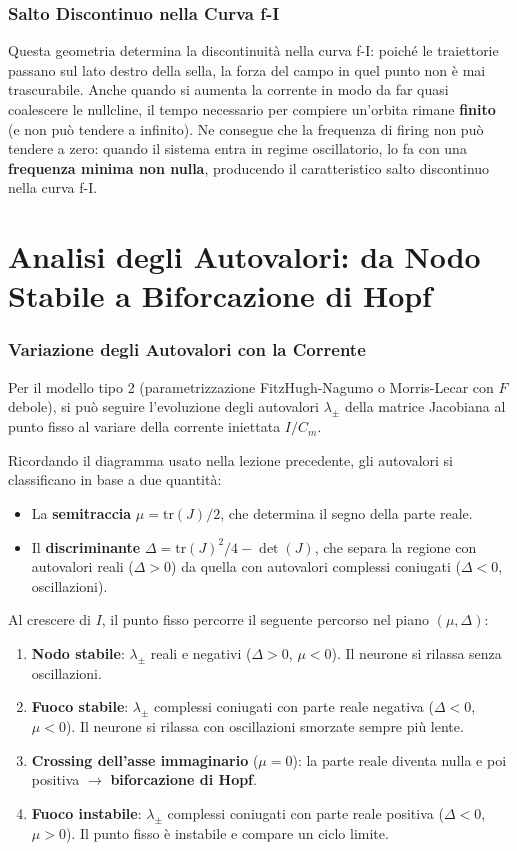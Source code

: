 \subsubsection{Salto Discontinuo nella Curva f-I}
Questa geometria determina la discontinuità nella curva f-I: poiché le traiettorie passano sul lato destro della sella, la forza del campo in quel punto non è mai trascurabile. Anche quando si aumenta la corrente in modo da far quasi coalescere le nullcline, il tempo necessario per compiere un'orbita rimane \textbf{finito} (e non può tendere a infinito). Ne consegue che la frequenza di firing non può tendere a zero: quando il sistema entra in regime oscillatorio, lo fa con una \textbf{frequenza minima non nulla}, producendo il caratteristico salto discontinuo nella curva f-I.

\section{Analisi degli Autovalori: da Nodo Stabile a Biforcazione di Hopf}

\subsubsection{Variazione degli Autovalori con la Corrente}

Per il modello tipo 2 (parametrizzazione FitzHugh-Nagumo o Morris-Lecar con $F$ debole), si può seguire l'evoluzione degli autovalori $\lambda_\pm$ della matrice Jacobiana al punto fisso al variare della corrente iniettata $I/C_m$.

Ricordando il diagramma usato nella lezione precedente, gli autovalori si classificano in base a due quantità:
\begin{itemize}
    \item La \textbf{semitraccia} $\mu = \text{tr}(J)/2$, che determina il segno della parte reale.
    \item Il \textbf{discriminante} $\Delta = \text{tr}(J)^2/4 - \det(J)$, che separa la regione con autovalori reali ($\Delta > 0$) da quella con autovalori complessi coniugati ($\Delta < 0$, oscillazioni).
\end{itemize}

Al crescere di $I$, il punto fisso percorre il seguente percorso nel piano $(\mu, \Delta)$:

\begin{enumerate}
    \item \textbf{Nodo stabile}: $\lambda_\pm$ reali e negativi ($\Delta > 0$, $\mu < 0$). Il neurone si rilassa senza oscillazioni.
    \item \textbf{Fuoco stabile}: $\lambda_\pm$ complessi coniugati con parte reale negativa ($\Delta < 0$, $\mu < 0$). Il neurone si rilassa con oscillazioni smorzate sempre più lente.
    \item \textbf{Crossing dell'asse immaginario} ($\mu = 0$): la parte reale diventa nulla e poi positiva $\rightarrow$ \textbf{biforcazione di Hopf}.
    \item \textbf{Fuoco instabile}: $\lambda_\pm$ complessi coniugati con parte reale positiva ($\Delta < 0$, $\mu > 0$). Il punto fisso è instabile e compare un ciclo limite.
\end{enumerate}

